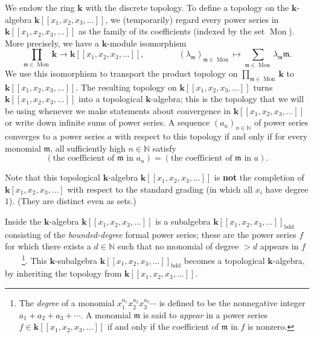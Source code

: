 \documentclass[numbers=enddot,12pt,final,onecolumn,notitlepage,abstracton]{scrartcl}%
\theoremstyle{definition}
\let\sumnonlimits\sum
\let\prodnonlimits\prod
\renewcommand{\sum}{\sumnonlimits\limits}
\renewcommand{\prod}{\prodnonlimits\limits}
\newcommand{\kk}{{\mathbf{k}}}
\newcommand{\Powser}{\mathbf{k}\left[\left[x_1,x_2,x_3,\ldots\right]\right]}
\newcommand{\bdd}{\operatorname{bdd}}
\newcommand{\NN}{{\mathbb{N}}}
\begin{document}
{We endow the ring $\mathbf{k}$ with the discrete topology. To define a
topology on the $\mathbf{k}$-algebra $\Powser$, we (temporarily) regard every power
series in $\Powser$ as the family of its coefficients (indexed by the
set $\operatorname{Mon}$). More precisely, we have a
$\kk$-module isomorphism
\[
\prod_{\mathfrak{m} \in \operatorname{Mon}} \kk \to \Powser,
\qquad \qquad \left(\lambda_{\mathfrak{m}}\right)_{\mathfrak{m} \in \operatorname{Mon}}
\mapsto \sum_{\mathfrak{m} \in \operatorname{Mon}} \lambda_{\mathfrak{m}} \mathfrak{m} .
\]
We use this isomorphism to transport the product topology on
$\prod_{\mathfrak{m} \in \operatorname{Mon}} \kk$ to $\Powser$. The
resulting topology on $\Powser$ turns $\Powser$ into a topological
$\kk$-algebra; this is the topology that we will
be using whenever we make statements about convergence in $\Powser$
or write down infinite sums of power series.
A sequence $\left( a_n \right)_{n \in \NN}$ of power series converges
to a power series $a$ with respect to this topology if
and only if for every monomial $\mathfrak{m}$, all sufficiently high
$n \in \NN$ satisfy
\[
\left(  \text{the coefficient of } \mathfrak{m}\text{ in }a_{n}\right)
=\left(  \text{the coefficient of } \mathfrak{m}\text{ in }a\right)  .
\]

Note that this topological $\kk$-algebra $\Powser$ is \textbf{not}
the completion of $\mathbf{k}\left[  x_{1},x_{2},x_{3},\ldots\right]$
with respect to the standard grading (in which all $x_{i}$ have degree $1$).
(They are distinct even as sets.)
}

Inside the $\kk$-algebra $\Powser$ is a
subalgebra $\Powser_{\bdd}$ consisting of the \textit{bounded-degree}
formal power series; these are the power series $f$ for which there
exists a $d \in \NN$ such that no monomial of degree $> d$ appears in
$f$\ \ \ \ \footnote{The \textit{degree} of a monomial
$x_1^{a_1} x_2^{a_2} x_3^{a_3} \cdots$ is defined to be the nonnegative
integer $a_1 + a_2 + a_3 + \cdots$. A monomial $\mathfrak{m}$ is said
to \textit{appear} in a power series $f \in \Powser$ if and only if
the coefficient of $\mathfrak{m}$ in $f$ is nonzero.}.
This $\kk$-subalgebra $\Powser_{\bdd}$ becomes a topological
$\kk$-algebra, by inheriting the topology from $\Powser$.
\end{document}
